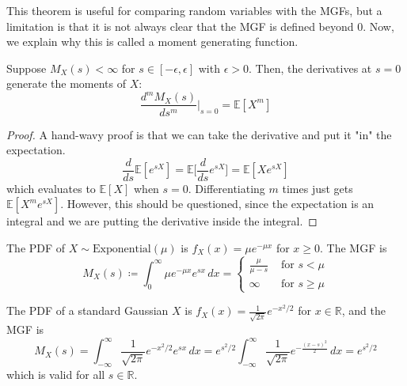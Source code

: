     This theorem is useful for comparing random variables with the MGFs, but a limitation is that it is not always clear that the MGF is defined beyond $0$. Now, we explain why this is called a moment generating function. 

    \begin{theorem}
      Suppose $M_X (s) < \infty$ for $s \in [-\epsilon, \epsilon]$ with $\epsilon > 0$. Then, the derivatives at $s = 0$ generate the moments of $X$: 
      \begin{equation}
        \frac{d^m M_X (s)}{d s^m} \bigg|_{s = 0} = \mathbb{E}[X^m]
      \end{equation}
    \end{theorem}
    \begin{proof}
      A hand-wavy proof is that we can take the derivative and put it "in" the expectation. 
      \begin{equation}
        \frac{d}{ds} \mathbb{E}[e^{s X}] = \mathbb{E} \big[ \frac{d}{ds} e^{s X} \big] = \mathbb{E}[X e^{s X}]
      \end{equation}
      which evaluates to $\mathbb{E}[X]$ when $s = 0$. Differentiating $m$ times just gets $\mathbb{E}[X^m e^{s X}]$. However, this should be questioned, since the expectation is an integral and we are putting the derivative inside the integral. 
    \end{proof}

    \begin{example}[Exponential RV]
      The PDF of $X \sim \mathrm{Exponential}(\mu)$ is $f_X (x) = \mu e^{-\mu x}$ for $x \geq 0$. The MGF is 
      \begin{equation}
        M_X (s) \coloneqq \int_0^\infty \mu e^{-\mu x} e^{s x} \, dx = \begin{cases} 
        \frac{\mu}{\mu - s} & \text{ for } s < \mu \\
        \infty & \text{ for } s \geq \mu 
      \end{cases}
      \end{equation}
    \end{example}

    \begin{example}[Gaussian RV]
      The PDF of a standard Gaussian $X$ is $f_X (x) = \frac{1}{\sqrt{2\pi}} e^{-x^2 / 2}$ for $x \in \mathbb{R}$, and the MGF is 
      \begin{equation}
        M_X (s) = \int_{-\infty}^\infty \frac{1}{\sqrt{2 \pi}} e^{- x^2 / 2} e^{s x} \,dx = e^{s^2 / 2} \int_{-\infty}^\infty \frac{1}{\sqrt{2\pi}} e^{-\frac{(x - s)^2}{2}}\,dx = e^{s^2 / 2}
      \end{equation}
      which is valid for all $s \in \mathbb{R}$. 
    \end{example}

